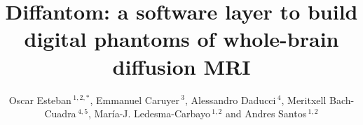 \documentclass[english]{frontiers/frontiersSCNS} %
\def\firstAuthorLast{Esteban {et~al.}} %
\def\Authors{Oscar Esteban\,$^{1,2,*}$, Emmanuel Caruyer\,$^{3}$, Alessandro Daducci\,$^{4}$, Meritxell Bach-Cuadra\,$^{4,5}$,%
Mar\'ia-J. Ledesma-Carbayo\,$^{1,2}$ and Andres Santos\,$^{1,2}$}
\begin{document}
\onecolumn
{}

\title[Diffantom]{Diffantom: a software layer to build digital phantoms of whole-brain diffusion MRI}

\author[\firstAuthorLast ]{\Authors} %
\address{} %
\correspondance{} %

\extraAuth{}%


\maketitle

\linenumbers
\end{document}
